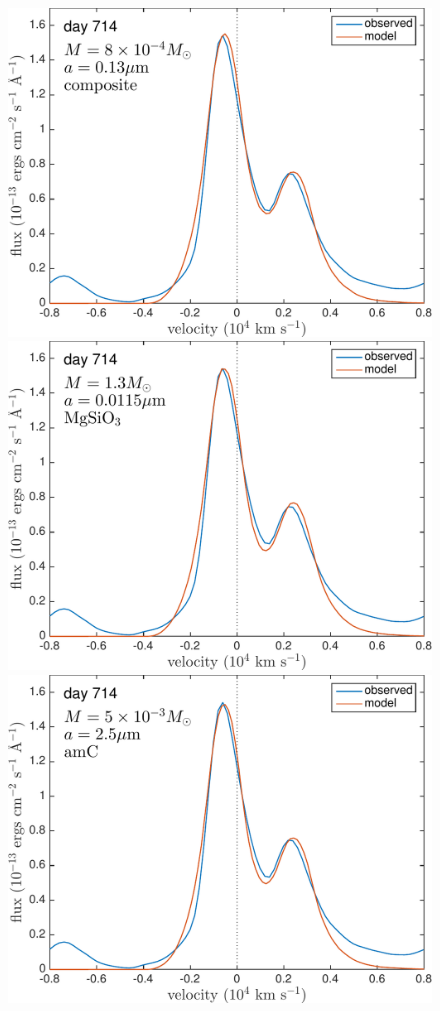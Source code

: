 \begin{landscape}
\begin{figure}
\includegraphics[trim =0 0 0 -25,clip=true,scale=0.33]{chapters/chapter5/images/silicates_take2/OI/composit_bestfit.pdf}
\includegraphics[trim =25 0 0 -25,clip=true,scale=0.33]{chapters/chapter5/images/silicates_take2/OI/MgSiO3_bestfit.pdf}
\includegraphics[trim =25 0 0 -25,clip=true,scale=0.33]{chapters/chapter5/images/silicates_take2/OI/AmC_bestfit.pdf}

\end{figure}
\end{landscape}
